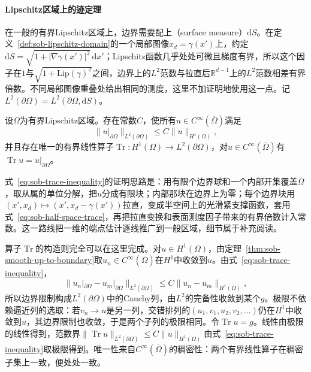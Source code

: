 \paragraph{Lipschitz区域上的迹定理}
在一般的有界Lipschitz区域上，边界需要配上（surface measure）$\mathrm dS$。在定义~\ref{def:sob-lipschitz-domain}的一个局部图像$x_d=\gamma(x')$上，约定$\mathrm dS=\sqrt{1+|\nabla\gamma(x')|^2}\,\mathrm dx'$；Lipschitz函数几乎处处可微且梯度有界，所以这个因子在$1$与$\sqrt{1+\mathrm{Lip}(\gamma)^2}$之间，边界上的$L^2$范数与拉直后$\mathbb R^{d-1}$上的$L^2$范数相差有界倍数。不同局部图像重叠处给出相同的测度，这里不加证明地使用这一点。记$L^2(\partial\Omega)=L^2(\partial\Omega,\mathrm dS)$。

\begin{theorem}[迹定理]
\label{thm:sob-trace}
设$\Omega$为有界Lipschitz区域。存在常数$C$，使所有$u\in C^\infty(\overline\Omega)$满足
\begin{equation}
 \|u|_{\partial\Omega}\|_{L^2(\partial\Omega)}\le C\|u\|_{H^1(\Omega)} ,
 \label{eq:sob-trace-inequality}
\end{equation}
并且存在唯一的有界线性算子$\operatorname{Tr}:H^1(\Omega)\to L^2(\partial\Omega)$，对$u\in C^\infty(\overline\Omega)$有$\operatorname{Tr}u=u|_{\partial\Omega}$。
\end{theorem}

式~\eqref{eq:sob-trace-inequality}的证明思路是：用有限个边界球和一个内部开集覆盖$\overline\Omega$，取从属的单位分解，把$u$分成有限块；内部那块在边界上为零；每个边界块用$(x',x_d)\mapsto(x',x_d-\gamma(x'))$拉直，变成半空间上的光滑紧支撑函数，套用式~\eqref{eq:sob-half-space-trace}，再把拉直变换和表面测度因子带来的有界倍数计入常数。这一路线把一维的端点估计逐线推广到一般区域，细节属于补充阅读。

算子$\operatorname{Tr}$的构造则完全可以在这里完成。对$u\in H^1(\Omega)$，由定理~\ref{thm:sob-smooth-up-to-boundary}取$u_n\in C^\infty(\overline\Omega)$在$H^1$中收敛到$u$。由式~\eqref{eq:sob-trace-inequality}，
\[
 \|u_n|_{\partial\Omega}-u_m|_{\partial\Omega}\|_{L^2(\partial\Omega)}\le C\|u_n-u_m\|_{H^1(\Omega)},
\]
所以边界限制构成$L^2(\partial\Omega)$中的Cauchy列，由$L^2$的完备性收敛到某个$g$。极限不依赖逼近列的选取：若$v_n\to u$是另一列，交错排列的$(u_1,v_1,u_2,v_2,\ldots)$仍在$H^1$中收敛到$u$，其边界限制也收敛，于是两个子列的极限相同。令$\operatorname{Tr}u=g$。线性由极限的线性得到，范数界$\|\operatorname{Tr}u\|_{L^2(\partial\Omega)}\le C\|u\|_{H^1(\Omega)}$由式~\eqref{eq:sob-trace-inequality}取极限得到。唯一性来自$C^\infty(\overline\Omega)$的稠密性：两个有界线性算子在稠密子集上一致，便处处一致。

